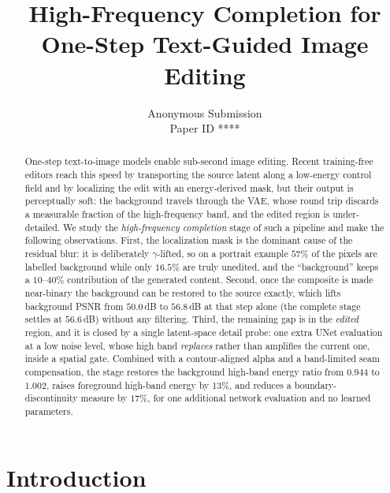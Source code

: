 \documentclass[10pt,twocolumn,letterpaper]{article}
\def\cvprPaperID{****}         %
\begin{document}
\title{High-Frequency Completion for One-Step Text-Guided Image Editing}

\author{Anonymous Submission\\
Paper ID \cvprPaperID}

\maketitle

\begin{abstract}
One-step text-to-image models enable sub-second image editing. Recent
training-free editors reach this speed by transporting the source latent along a
low-energy control field and by localizing the edit with an energy-derived mask,
but their output is perceptually soft: the background travels through the VAE,
whose round trip discards a measurable fraction of the high-frequency band, and
the edited region is under-detailed. We study the \emph{high-frequency
completion} stage of such a pipeline and make the following observations. First,
the localization mask is the dominant cause of the residual blur: it is
deliberately $\gamma$-lifted, so on a portrait example $57\%$ of the pixels are
labelled background while only $16.5\%$ are truly unedited, and the ``background''
keeps a $10$--$40\%$ contribution of the generated content. Second, once the
composite is made near-binary the background can be restored to the source
exactly, which lifts background PSNR from $50.0$\,dB to $56.8$\,dB at that step
alone (the complete stage settles at $56.6$\,dB) without any filtering. Third,
the remaining gap is in the \emph{edited} region, and it is
closed by a single latent-space detail probe: one extra UNet evaluation at a low
noise level, whose high band \emph{replaces} rather than amplifies the current
one, inside a spatial gate. Combined with a contour-aligned alpha and a
band-limited seam compensation, the stage restores the background high-band
energy ratio from $0.944$ to $1.002$, raises foreground high-band energy by
$13\%$, and reduces a boundary-discontinuity measure by $17\%$, for one
additional network evaluation and no learned parameters.
\end{abstract}

\section{Introduction}
\label{sec:intro}
\end{document}
